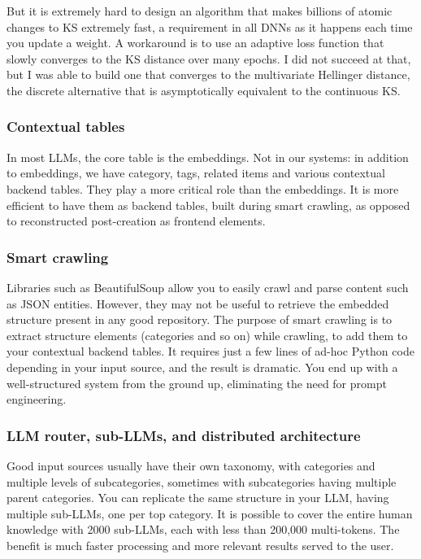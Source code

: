 \documentclass[10pt]{article}
\begin{document}
{But it is extremely hard to design an algorithm that makes billions of atomic changes to KS extremely fast, a requirement in all DNNs as it happens each time you update a weight. A workaround is to use an \textcolor{index}{adaptive loss function} that slowly converges to the KS distance over many epochs. I did not succeed at that, but I was able to build one that converges to the \textcolor{index}{multivariate Hellinger distance}, the discrete alternative that is asymptotically equivalent to the continuous KS.

\subsubsection{Contextual tables}
In most LLMs, the core table is the \textcolor{index}{embeddings}. Not in our systems: in addition to embeddings, we have category, tags, related items and various \textcolor{index}{contextual backend tables}. They play a more critical role than the embeddings. It is more efficient to have them as backend tables, built during \textcolor{index}{smart crawling}, as opposed to reconstructed post-creation as frontend elements.

\subsubsection{Smart crawling}
Libraries such as BeautifulSoup allow you to easily crawl and parse content such as JSON entities. However, they may not be useful to retrieve the embedded structure present in any good repository. The purpose of \textcolor{index}{smart crawling} is to extract structure elements (categories and so on) while crawling, to add them to your contextual backend tables. It requires just a few lines of ad-hoc Python code depending in your input source, and the result is dramatic. You end up with a well-structured system from the ground up, eliminating the need for prompt engineering.


\subsubsection{LLM router, sub-LLMs, and distributed architecture}
Good input sources usually have their own taxonomy, with categories and multiple levels of subcategories, sometimes with subcategories having multiple parent categories. You can replicate the same structure in your LLM, having multiple sub-LLMs, one per top category. It is possible to cover the entire human knowledge with 2000 sub-LLMs, each with less than 200,000 multi-tokens. The benefit is much faster processing and more relevant results served to the user.

}
\end{document}

